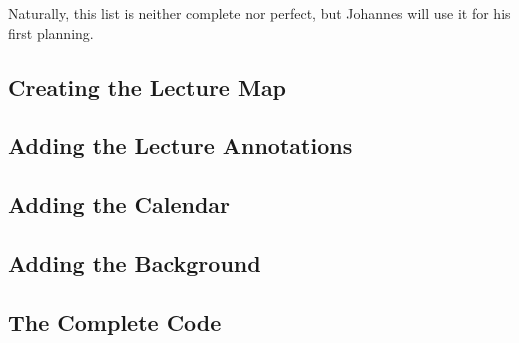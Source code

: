 Naturally, this list is neither complete nor perfect, but Johannes
will use it for his first planning.




\subsection{Creating the Lecture Map}

\subsection{Adding the Lecture Annotations}

\subsection{Adding the Calendar}

\subsection{Adding the Background}

\subsection{The Complete Code}
